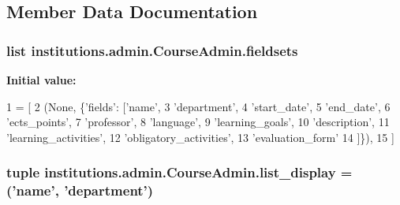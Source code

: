 \subsection{Member Data Documentation}
\hypertarget{classinstitutions_1_1admin_1_1_course_admin_ac168d91a1bae0bd65963653ce18362f7}{
\subsubsection[{fieldsets}]{\setlength{\rightskip}{0pt plus 5cm}list institutions.\-admin.\-Course\-Admin.\-fieldsets\hspace{0.3cm}{\ttfamily [static]}}}\label{classinstitutions_1_1admin_1_1_course_admin_ac168d91a1bae0bd65963653ce18362f7}
{\bfseries Initial value\-:}
\begin{DoxyCode}
1 = [
2         (\textcolor{keywordtype}{None}, \{\textcolor{stringliteral}{'fields'}: [\textcolor{stringliteral}{'name'},
3                            \textcolor{stringliteral}{'department'},
4                            \textcolor{stringliteral}{'start\_date'},
5                            \textcolor{stringliteral}{'end\_date'},
6                            \textcolor{stringliteral}{'ects\_points'},
7                            \textcolor{stringliteral}{'professor'},
8                            \textcolor{stringliteral}{'language'},
9                            \textcolor{stringliteral}{'learning\_goals'},
10                            \textcolor{stringliteral}{'description'},
11                            \textcolor{stringliteral}{'learning\_activities'},
12                            \textcolor{stringliteral}{'obligatory\_activities'},
13                            \textcolor{stringliteral}{'evaluation\_form'}
14         ]\}),
15     ]
\end{DoxyCode}
\hypertarget{classinstitutions_1_1admin_1_1_course_admin_aaa0484f1e6ef42ee85f01fca6b3ce723}{
\subsubsection[{list\-\_\-display}]{\setlength{\rightskip}{0pt plus 5cm}tuple institutions.\-admin.\-Course\-Admin.\-list\-\_\-display = ('name', 'department')\hspace{0.3cm}{\ttfamily [static]}}}\label{classinstitutions_1_1admin_1_1_course_admin_aaa0484f1e6ef42ee85f01fca6b3ce723}
